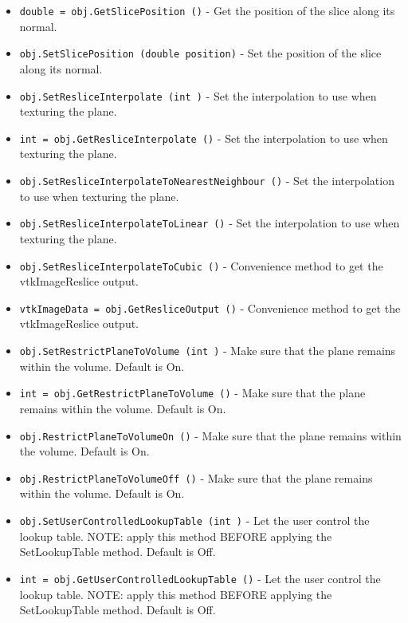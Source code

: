 \begin{itemize}
\item  \verb|double = obj.GetSlicePosition ()| -  Get the position of the slice along its normal.

\item  \verb|obj.SetSlicePosition (double position)| -  Set the position of the slice along its normal.

\item  \verb|obj.SetResliceInterpolate (int )| -  Set the interpolation to use when texturing the plane.

\item  \verb|int = obj.GetResliceInterpolate ()| -  Set the interpolation to use when texturing the plane.

\item  \verb|obj.SetResliceInterpolateToNearestNeighbour ()| -  Set the interpolation to use when texturing the plane.

\item  \verb|obj.SetResliceInterpolateToLinear ()| -  Set the interpolation to use when texturing the plane.

\item  \verb|obj.SetResliceInterpolateToCubic ()| -  Convenience method to get the vtkImageReslice output.

\item  \verb|vtkImageData = obj.GetResliceOutput ()| -  Convenience method to get the vtkImageReslice output.

\item  \verb|obj.SetRestrictPlaneToVolume (int )| -  Make sure that the plane remains within the volume.
 Default is On.

\item  \verb|int = obj.GetRestrictPlaneToVolume ()| -  Make sure that the plane remains within the volume.
 Default is On.

\item  \verb|obj.RestrictPlaneToVolumeOn ()| -  Make sure that the plane remains within the volume.
 Default is On.

\item  \verb|obj.RestrictPlaneToVolumeOff ()| -  Make sure that the plane remains within the volume.
 Default is On.

\item  \verb|obj.SetUserControlledLookupTable (int )| -  Let the user control the lookup table. NOTE: apply this method BEFORE
 applying the SetLookupTable method.
 Default is Off.

\item  \verb|int = obj.GetUserControlledLookupTable ()| -  Let the user control the lookup table. NOTE: apply this method BEFORE
 applying the SetLookupTable method.
 Default is Off.


\end{itemize}
